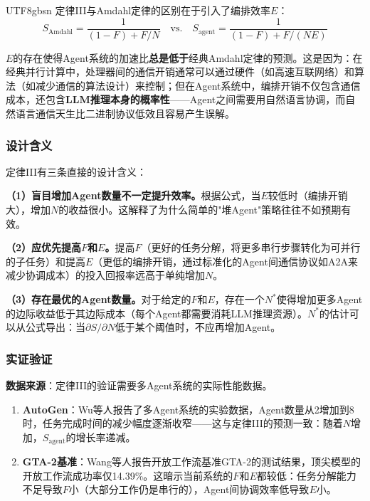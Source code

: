 \documentclass[11pt,a4paper]{article}
\begin{document}
\begin{CJK*}{UTF8}{gbsn}
定律III与Amdahl定律的区别在于引入了编排效率$E$：
\begin{equation}
S_{\mathrm{Amdahl}} = \frac{1}{(1-F) + F/N} \quad \text{vs.} \quad S_{\mathrm{agent}} = \frac{1}{(1-F) + F/(NE)}
\end{equation}

$E$的存在使得Agent系统的加速比\textbf{总是低于}经典Amdahl定律的预测。这是因为：在经典并行计算中，处理器间的通信开销通常可以通过硬件（如高速互联网络）和算法（如减少通信的算法设计）来控制；但在Agent系统中，编排开销不仅包含通信成本，还包含\textbf{LLM推理本身的概率性}——Agent之间需要用自然语言协调，而自然语言通信天生比二进制协议低效且容易产生误解。

\subsubsection{设计含义}

定律III有三条直接的设计含义：

\textbf{（1）盲目增加Agent数量不一定提升效率。}根据公式，当$E$较低时（编排开销大），增加$N$的收益很小。这解释了为什么简单的"堆Agent"策略往往不如预期有效。

\textbf{（2）应优先提高$F$和$E$。}提高$F$（更好的任务分解，将更多串行步骤转化为可并行的子任务）和提高$E$（更低的编排开销，通过标准化的Agent间通信协议如A2A\cite{agentprotocols2025}来减少协调成本）的投入回报率远高于单纯增加$N$。

\textbf{（3）存在最优的Agent数量。}对于给定的$F$和$E$，存在一个$N^*$使得增加更多Agent的边际收益低于其边际成本（每个Agent都需要消耗LLM推理资源）。$N^*$的估计可以从公式导出：当$\partial S / \partial N$低于某个阈值时，不应再增加Agent。

\subsubsection{实证验证}

\textbf{数据来源}：定律III的验证需要多Agent系统的实际性能数据。

\begin{enumerate}[nosep]
\item \textbf{AutoGen}：Wu等人报告了多Agent系统的实验数据，Agent数量从2增加到8时，任务完成时间的减少幅度逐渐收窄\cite{wu2023autogen}——这与定律III的预测一致：随着$N$增加，$S_{\mathrm{agent}}$的增长率递减。

\item \textbf{GTA-2基准}：Wang等人报告开放工作流基准GTA-2的测试结果，顶尖模型的开放工作流成功率仅14.39\%\cite{gta2_2025}。这暗示当前系统的$F$和$E$都较低：任务分解能力不足导致$F$小（大部分工作仍是串行的），Agent间协调效率低导致$E$小。


\end{enumerate}
\end{CJK*}
\end{document}
